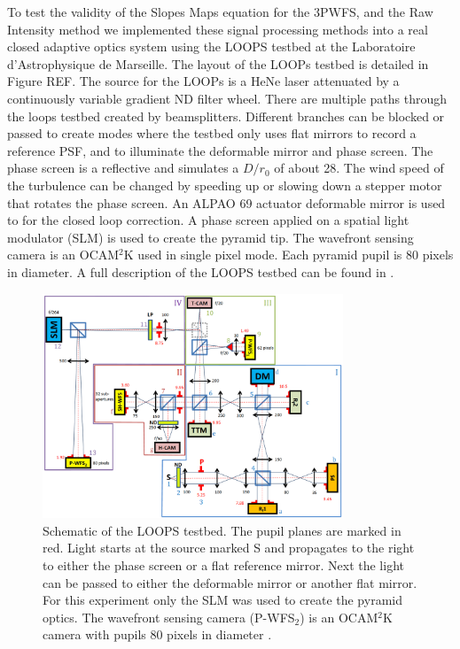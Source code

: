 To test the validity of the Slopes Maps equation for the 3PWFS, and the Raw Intensity method we implemented these signal processing methods into a real closed adaptive optics system using the LOOPS testbed at the Laboratoire d'Astrophysique de Marseille.  The layout of the LOOPs testbed is detailed in Figure REF. The source for the LOOPs is a HeNe laser attenuated by a continuously variable gradient ND filter wheel. There are multiple paths through the loops testbed created by beamsplitters. Different branches can be blocked or passed to create modes where the testbed only uses flat mirrors to record a reference PSF, and to illuminate the deformable mirror and phase screen. The phase screen is a reflective and simulates a $D/r_0$ of about 28. The wind speed of the turbulence can be changed by speeding up or slowing down a stepper motor that rotates the phase screen. An ALPAO 69 actuator deformable mirror is used to for the closed loop correction. A phase screen applied on a spatial light modulator (SLM) is used to create the pyramid tip. The wavefront sensing camera is an OCAM$^2$K used in single pixel mode. Each pyramid pupil is 80 pixels in diameter. A full description of the LOOPS testbed can be found in  \cite{janin2019adaptive}. 

\begin{figure}
    \centering
    \includegraphics[width=0.8\textwidth]{Chapter Materials/Chapter Four Materials/LOOPSdiagram.png}
    \caption{Schematic of the LOOPS testbed. The pupil planes are marked in red. Light starts at the source marked S and propagates to the right to either the phase screen or a flat reference mirror. Next the light can be passed to either the deformable mirror or another flat mirror. For this experiment only the SLM was used to create the pyramid optics. The wavefront sensing camera (P-WFS$_2$) is an OCAM$^2$K camera with pupils 80 pixels in diameter \citep{janin2019adaptive}.}
    \label{fig:my_label}
\end{figure}


